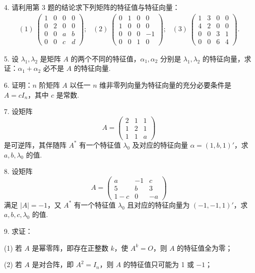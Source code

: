 \documentclass[UTF8,12pt,a4paper,fontset=fandol]{ctexart}
\begin{document}
4. 请利用第 3 题的结论求下列矩阵的特征值与特征向量：
\[
\begin{array}{ccc}
(1)\ \left(\begin{array}{cccc}
1 & 0 & 0 & 0\\
0 & 2 & 0 & 0\\
0 & 0 & a & b\\
0 & 0 & c & d
\end{array}\right);&
(2)\ \left(\begin{array}{cccc}
0 & 1 & 0 & 0\\
1 & 0 & 0 & 0\\
0 & 0 & 0 & -1\\
0 & 0 & 1 & 0
\end{array}\right);&
(3)\ \left(\begin{array}{cccc}
1 & 3 & 0 & 0\\
4 & 2 & 0 & 0\\
0 & 0 & 3 & 1\\
0 & 0 & 6 & 4
\end{array}\right).
\end{array}
\]

5. 设 $\lambda_1,\lambda_2$ 是矩阵 $A$ 的两个不同的特征值，$\alpha_1,\alpha_2$ 分别是 $\lambda_1,\lambda_2$ 的特征向量，求证：$\alpha_1+\alpha_2$ 必不是 $A$ 的特征向量.

6. 证明：$n$ 阶矩阵 $A$ 以任一 $n$ 维非零列向量为特征向量的充分必要条件是 $A=cI_n$，其中 $c$ 是常数.

7. 设矩阵
\[
A=\left(\begin{array}{ccc}
2 & 1 & 1\\
1 & 2 & 1\\
1 & 1 & a
\end{array}\right)
\]
是可逆阵，其伴随阵 $A^*$ 有一个特征值 $\lambda_0$ 及对应的特征向量 $\alpha=(1,b,1)'$，求 $a,b,\lambda_0$ 的值.

8. 设矩阵
\[
A=\left(\begin{array}{ccc}
a & -1 & c\\
5 & b & 3\\
1-c & 0 & -a
\end{array}\right)
\]
满足 $|A|=-1$，又 $A^*$ 有一个特征值 $\lambda_0$ 且对应的特征向量为 $(-1,-1,1)'$，求 $a,b,c,\lambda_0$ 的值.

9. 求证：

(1) 若 $A$ 是幂零阵，即存在正整数 $k$，使 $A^k=O$，则 $A$ 的特征值全为零；

(2) 若 $A$ 是对合阵，即 $A^2=I_n$，则 $A$ 的特征值只可能为 1 或 $-1$；
\end{document}

